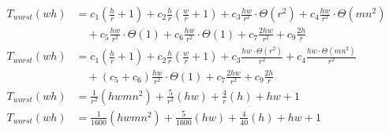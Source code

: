 \begin{subequations}
\label{eq:linedetection-clarke}
\begin{align}
\label{eq:linedetection-clarke-1}
T_{worst}(wh)& =
c_{1}(\frac{h}{r} + 1)
+ c_{2}\frac{h}{r}(\frac{w}{r} + 1)
+ c_{3}\frac{hw}{r^2} \cdot \Theta(r^2)
+ c_{4}\frac{hw}{r^2} \cdot \Theta(mn^2)
\\
& \quad
+ c_{5}\frac{hw}{r^2} \cdot \Theta(1)
+ c_{6}\frac{hw}{r^2} \cdot \Theta(1)
+ c_{7}\frac{2hw}{r^2}
+ c_{9}\frac{2h}{r}
\nonumber \\
\label{eq:linedetection-clarke-2}
T_{worst}(wh)& =
c_{1}(\frac{h}{r} + 1)
+ c_{2}\frac{h}{r}(\frac{w}{r} + 1)
+ c_{3}\frac{hw\cdot\Theta(r^2)}{r^2}
+ c_{4}\frac{hw\cdot\Theta(mn^2)}{r^2}
\\
& \quad
+ (c_{5} + c_{6})\frac{hw}{r^2} \cdot \Theta(1)
+ c_{7}\frac{2hw}{r^2}
+ c_{9}\frac{2h}{r}
\nonumber \\
\label{eq:linedetection-clarke-3}
T_{worst}(wh)& = \frac{1}{r^2}(hwmn^2) + \frac{5}{r^2}(hw) + \frac{4}{r}(h) + hw + 1
\\
\label{eq:linedetection-clarke-4}
T_{worst}(wh)& = \frac{1}{1600}(hwmn^2) + \frac{5}{1600}(hw) + \frac{4}{40}(h) + hw + 1
\end{align}
\end{subequations}
